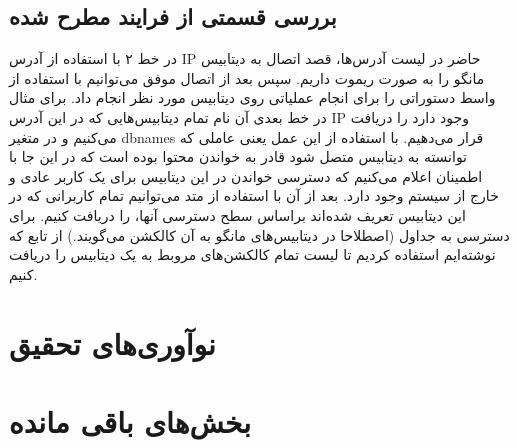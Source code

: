 \documentclass[10pt, a4paper]{article}
\begin{document}
\subsection{بررسی قسمتی از فرایند مطرح شده}

در خط ۲ با استفاده از آدرس IP حاضر در لیست آدرس‌ها، قصد اتصال به دیتابیس مانگو
را به صورت ریموت داریم. سپس بعد از اتصال موفق می‌توانیم با استفاده از واسط
 دستوراتی را برای انجام عملیاتی روی دیتابیس مورد نظر انجام داد.
برای مثال در خط بعدی آن نام تمام دیتابیس‌هایی که در این آدرس IP وجود دارد را
دریافت می‌کنیم و در متغیر dbnames قرار می‌دهیم. با استفاده از این عمل یعنی
عاملی که توانسته به دیتابیس متصل شود قادر به خواندن محتوا بوده است که در این جا
با اطمینان اعلام می‌کنیم که دسترسی خواندن در این دیتابیس برای یک کاربر عادی و
خارج از سیستم وجود دارد. بعد از آن با استفاده از متد  می‌توانیم
تمام کاربرانی که در این دیتابیس تعریف شده‌اند براساس سطح دسترسی آنها، را دریافت
کنیم. برای دسترسی به جداول (اصطلاحا در دیتابیس‌های مانگو به آن کالکشن می‌گویند.)
از تابع که نوشته‌ایم استفاده کردیم تا لیست تمام کالکشن‌های مروبط به یک دیتابیس
را دریافت کنیم.


\section{نوآوری‌های تحقیق}

\section{بخش‌های باقی مانده}
\end{document}
